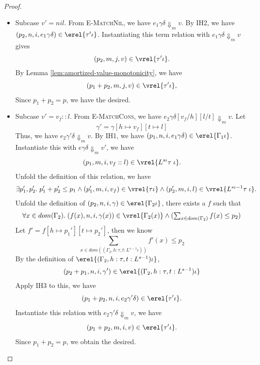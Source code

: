 \begin{proof}
\begin{itemize}
\begin{itemize}
  \item {Subcase $v'= nil$}.
From \textsc{E-MatchNil}, we have $e_1\gamma\delta \Downarrow_m v$.
By IH2, we have $(p_2,n, i, e_1\gamma\delta) \in \erel{\tau'\iota}$.
Instantiating this term relation with $e_1\gamma\delta \Downarrow_m v$ gives 
\[(p_2,m, j, v) \in \vrel{\tau'\iota}.\]
By Lemma \ref{lem:amortized-value-monotonicity}, we have 
\[(p_1+p_2,m, j, v) \in \vrel{\tau'\iota},\]
Since $p_1+p_2 = p$, we have the desired.

\item Subcase $v'= v_f::l$.
From \textsc{E-MatchCons}, we have $e_2\gamma\delta[v_f/h][l/t]\Downarrow_m v$.
Let \[\gamma' = \gamma[h\mapsto v_f][t\mapsto l]\] Thus, we have $e_2\gamma'\delta\Downarrow_m v$.
By IH1, we have $(p_1,n,i,e_1\gamma\delta) \in \erel{\Gamma_1\iota}$.
Instantiate this with $e\gamma\delta\Downarrow_m v'$, we have 
\[ (p_1,m, i,v_f::l) \in \vrel{L^{s\iota}\tau\;\iota}.\]
Unfold the definition of this relation, we have 
\[
  \exists p_1',p_2'.\;p_1'+p_2' \leq p_1 \land
  (p_1',m,i,v_f) \in \vrel{\tau \iota} \land
  (p_2',m,i,l) \in \vrel{L^{s\iota-1}\tau\;\iota}.
\]
Unfold the definition of $(p_2,n, i, \gamma) \in \erel{\Gamma_2\iota}$, there exists a $f$ such that 
\[
  \forall x\in{dom}(\Gamma_2).\;(f(x),n,i,\gamma(x))\in\vrel{\Gamma_2(x)} \land
        (\textstyle\sum_{x\in dom(\Gamma_2)}f(x)\leq p_2)
\]
Let $f' = f[h \mapsto p_1'][t \mapsto p_2']$, then we know 
\[\textstyle\sum_{x\in dom((\Gamma_2, h:\tau, t:L^{s-1}\iota))}f'(x)\leq p_2\]
By the definition of $\erel{(\Gamma_2, h:\tau, t:L^{s-1})\iota}$, 
\[ 
  (p_2+p_1, n, i, \gamma') \in \erel{(\Gamma_2,h:\tau,t:L^{s-1})\iota}
\] 
Apply IH3 to this, we have 
\[(p_1+p_2, n, i, e_2\gamma'\delta) \in \erel{\tau'\iota}.\]
Instantiate this relation with $e_2\gamma'\delta \Downarrow_m v$, we have 
\[(p_1+p_2, m, i, v) \in \erel{\tau'\iota}.\]
Since $p_1+p_2=p$, we obtain the desired.
\end{itemize}


\end{itemize}
\end{proof}
